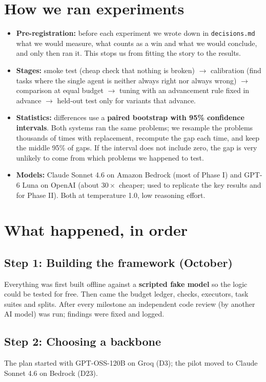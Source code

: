 \documentclass[11pt,a4paper]{article}
\begin{document}
\section{How we ran experiments}
\begin{itemize}
  \item \textbf{Pre-registration:} before each experiment we wrote down in \texttt{decisions.md} what we
        would measure, what counts as a win and what we would conclude, and only then ran it. This stops us
        from fitting the story to the results.
  \item \textbf{Stages:} smoke test (cheap check that nothing is broken) $\rightarrow$ calibration (find tasks
        where the single agent is neither always right nor always wrong) $\rightarrow$ comparison at equal
        budget $\rightarrow$ tuning with an advancement rule fixed in advance $\rightarrow$ held-out test only
        for variants that advance.
  \item \textbf{Statistics:} differences use a \textbf{paired bootstrap with 95\% confidence intervals}.
        Both systems ran the same problems; we resample the problems thousands of times with replacement,
        recompute the gap each time, and keep the middle 95\% of gaps. If the interval does not include
        zero, the gap is very unlikely to come from which problems we happened to test.
  \item \textbf{Models:} Claude Sonnet 4.6 on Amazon Bedrock (most of Phase I) and GPT-6 Luna on OpenAI
        (about $30\times$ cheaper; used to replicate the key results and for Phase II). Both at temperature
        1.0, low reasoning effort.
\end{itemize}

\section{What happened, in order}

\subsection*{Step 1: Building the framework (October)}
Everything was first built offline against a \textbf{scripted fake model} so the logic could be tested for
free. Then came the budget ledger, checks, executors, task suites and splits. After every milestone an
independent code review (by another AI model) was run; findings were fixed and logged.

\subsection*{Step 2: Choosing a backbone}
The plan started with GPT-OSS-120B on Groq (D3); the pilot moved to Claude Sonnet 4.6 on Bedrock (D23).
\end{document}
